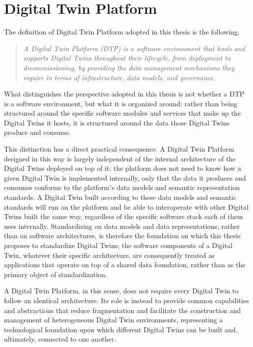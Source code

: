 \section{Digital Twin Platform}
\label{sec:dtp}

The definition of Digital Twin Platform adopted in this thesis is the following.

\begin{quote}
\textit{A Digital Twin Platform (DTP) is a software environment that hosts and supports Digital Twins throughout their lifecycle, from deployment to decommissioning, by providing the data management mechanisms they require in terms of infrastructure, data models, and governance.}
\end{quote}

What distinguishes the perspective adopted in this thesis is not whether a DTP is a software environment, but what it is organized around: rather than being structured around the specific software modules and services that make up the Digital Twins it hosts, it is structured around the data those Digital Twins produce and consume. 

This distinction has a direct practical consequence. A Digital Twin Platform designed in this way is largely independent of the internal architecture of the Digital Twins deployed on top of it: the platform does not need to know how a given Digital Twin is implemented internally, only that the data it produces and consumes conforms to the platform's data models and semantic representation standards. A Digital Twin built according to these data models and semantic standards will run on the platform and be able to interoperate with other Digital Twins built the same way, regardless of the specific software stack each of them uses internally. Standardizing on data models and data representations, rather than on software architectures, is therefore the foundation on which this thesis proposes to standardize Digital Twins; the software components of a Digital Twin, whatever their specific architecture, are consequently treated as applications that operate on top of a shared data foundation, rather than as the primary object of standardization.

A Digital Twin Platform, in this sense, does not require every Digital Twin to follow an identical architecture. Its role is instead to provide common capabilities and abstractions that reduce fragmentation and facilitate the construction and management of heterogeneous Digital Twin environments, representing a technological foundation upon which different Digital Twins can be built and, ultimately, connected to one another.

